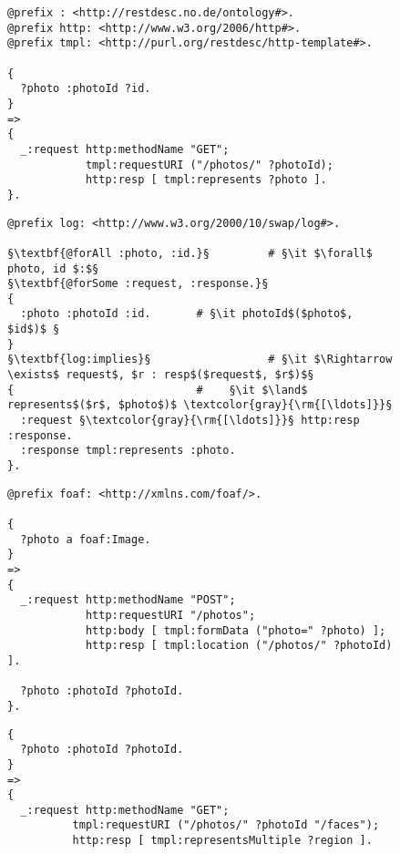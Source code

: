 \documentclass[smallextended]{svjour3}
\begin{document}
{\begin{figure}
\begin{lstlisting}[caption=RESTdesc description of photo retrieval,
                   label=lst:PhotoGet, escapechar=§]
@prefix : <http://restdesc.no.de/ontology#>.
@prefix http: <http://www.w3.org/2006/http#>.
@prefix tmpl: <http://purl.org/restdesc/http-template#>.

{
  ?photo :photoId ?id.
}
=>
{
  _:request http:methodName "GET";
            tmpl:requestURI ("/photos/" ?photoId);
            http:resp [ tmpl:represents ?photo ].
}.
\end{lstlisting}
\end{figure}

\begin{figure}
\begin{lstlisting}[caption=\autoref{lst:PhotoGet} with explicit quantifiers,
                   label=lst:PhotoGetQuantifiers, escapechar=§]
@prefix log: <http://www.w3.org/2000/10/swap/log#>.

§\textbf{@forAll :photo, :id.}§         # §\it $\forall$ photo, id $:$§
§\textbf{@forSome :request, :response.}§
{
  :photo :photoId :id.       # §\it photoId$($photo$, $id$)$ §
}
§\textbf{log:implies}§                  # §\it $\Rightarrow \exists$ request$, $r : resp$($request$, $r$)$§
{                            #    §\it $\land$ represents$($r$, $photo$)$ \textcolor{gray}{\rm{[\ldots]}}§
  :request §\textcolor{gray}{\rm{[\ldots]}}§ http:resp :response.
  :response tmpl:represents :photo.
}.
\end{lstlisting}
\end{figure}

\begin{figure}
\begin{lstlisting}[caption=RESTdesc description of photo upload,
                   label=lst:PhotoUpload, escapechar=§]
@prefix foaf: <http://xmlns.com/foaf/>.

{
  ?photo a foaf:Image.
}
=>
{
  _:request http:methodName "POST";
            http:requestURI "/photos";
            http:body [ tmpl:formData ("photo=" ?photo) ];
            http:resp [ tmpl:location ("/photos/" ?photoId) ].

  ?photo :photoId ?photoId.
}.
\end{lstlisting}
\end{figure}

\begin{figure}
\begin{lstlisting}[caption=RESTdesc description of face detection,
                   label=lst:FaceDetection, escapechar=§]
{
  ?photo :photoId ?photoId.
}
=>
{
  _:request http:methodName "GET";
          tmpl:requestURI ("/photos/" ?photoId "/faces");
          http:resp [ tmpl:representsMultiple ?region ].
  

\end{lstlisting}
\end{figure}}
\end{document}
